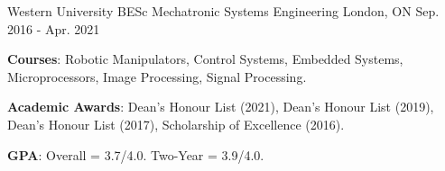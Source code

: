

\begin{cventries}

  \cventry
    {Western University} %
    {BESc Mechatronic Systems Engineering} %
    {London, ON} %
    {Sep. 2016 - Apr. 2021} %
    {
      \begin{cvitems} %
        \item {\textbf{Courses}: Robotic Manipulators, Control Systems, Embedded Systems, Microprocessors, Image Processing, Signal Processing.}
        \item {\textbf{Academic Awards}: Dean's Honour List (2021), Dean's Honour List (2019), Dean's Honour List (2017), Scholarship of Excellence (2016).}
        \item {\textbf{GPA}: Overall = 3.7/4.0. Two-Year = 3.9/4.0.}
      \end{cvitems}
    }

\end{cventries}

